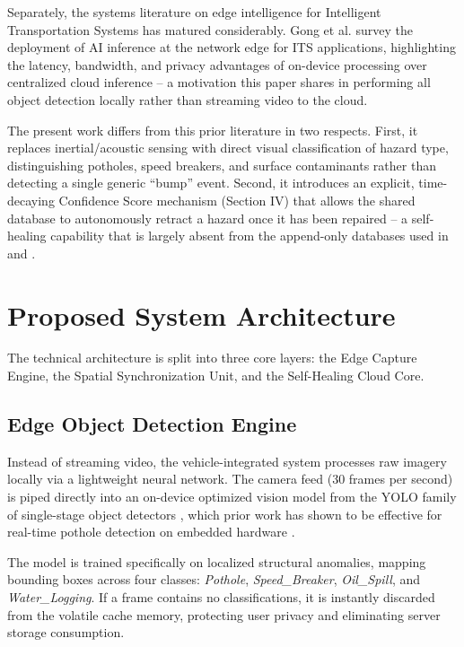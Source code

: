 \documentclass[conference]{IEEEtran}
\begin{document}
Separately, the systems literature on edge intelligence for Intelligent Transportation Systems has matured considerably. Gong et al. survey the deployment of AI inference at the network edge for ITS applications, highlighting the latency, bandwidth, and privacy advantages of on-device processing over centralized cloud inference \cite{b5} -- a motivation this paper shares in performing all object detection locally rather than streaming video to the cloud.

The present work differs from this prior literature in two respects. First, it replaces inertial/acoustic sensing with direct visual classification of hazard type, distinguishing potholes, speed breakers, and surface contaminants rather than detecting a single generic ``bump'' event. Second, it introduces an explicit, time-decaying Confidence Score mechanism (Section IV) that allows the shared database to autonomously retract a hazard once it has been repaired -- a self-healing capability that is largely absent from the append-only databases used in \cite{b2} and \cite{b3}.

\section{Proposed System Architecture}

The technical architecture is split into three core layers: the Edge Capture Engine, the Spatial Synchronization Unit, and the Self-Healing Cloud Core.

\subsection{Edge Object Detection Engine}

Instead of streaming video, the vehicle-integrated system processes raw imagery locally via a lightweight neural network. The camera feed (30 frames per second) is piped directly into an on-device optimized vision model from the YOLO family of single-stage object detectors \cite{b1}, which prior work has shown to be effective for real-time pothole detection on embedded hardware \cite{b4}.

The model is trained specifically on localized structural anomalies, mapping bounding boxes across four classes: \textit{Pothole}, \textit{Speed\_Breaker}, \textit{Oil\_Spill}, and \textit{Water\_Logging}. If a frame contains no classifications, it is instantly discarded from the volatile cache memory, protecting user privacy and eliminating server storage consumption.
\end{document}

